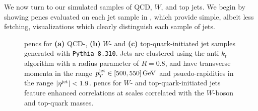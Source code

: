 We now turn to our simulated samples of QCD, \(W\), and top jets.
%
We begin by showing \glspl{penc} evaluated on each jet sample in , which provide simple, albeit less fetching, visualizations which clearly distinguish each sample of jets.
\begin{figure}[t]
    \caption[Projected energy correlators on simulated QCD, \(W\), and top jets.]{
        \glspl{penc} for {\textbf{(a)}} QCD-, {\textbf{(b)}} $W$- and {\textbf{(c)}} top-quark-initiated jet samples generated with \texttt{Pythia 8.310}.
        Jets are clustered using the anti-$k_t$ algorithm with a radius parameter of $R=0.8$, and have transverse momenta in the range $p_T^{\rm jet} \in [500,550] \,\text{GeV}$ and psuedo-rapidities in the range $\vert \eta^{\rm jet}\vert < 1.9$.
        \glspl{penc} for $W$- and top-quark-initiated jets feature enhanced correlations at scales correlated with the $W$-boson and top-quark masses.
    }
	\label{fig:pythia_pencs}%
\end{figure}

